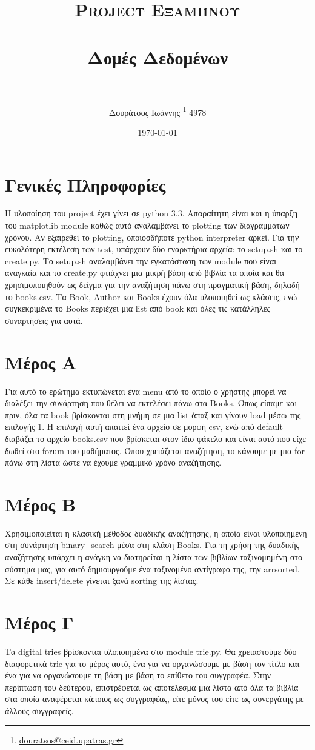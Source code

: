 \documentclass[a4paper]{article}
\title{	
\normalfont \normalsize 
\textsc{Project Εξαμήνου} \\ [30pt] %
\horrule{0.5pt} \\[0.4cm] %
\huge Δομές Δεδομένων \\ %
\horrule{2pt} \\[0.5cm] %
\vspace*{4\baselineskip}
}
\author[]{Δουράτσος Ιωάννης  \thanks{\href{mailto:douratsos@ceid.upatras.gr}{douratsos@ceid.upatras.gr}} 4978 }
\affil[]{Τμήμα Μηχανικών Η/Υ και Πληροφορικής, Πανεπιστήμιο Πατρών}
\date{\normalsize\today} %
\begin{document}
\newpage
\maketitle %
\newpage
\tableofcontents
\vspace*{1\baselineskip}
\newpage
\section{Γενικές Πληροφορίες}
Η υλοποίηση του project έχει γίνει σε python 3.3. Απαραίτητη είναι και η ύπαρξη του matplotlib module καθώς αυτό αναλαμβάνει το plotting των διαγραμμάτων χρόνου.
Αν εξαιρεθεί το plotting, οποιοσδήποτε python interpreter αρκεί.
Για την ευκολότερη εκτέλεση των test, υπάρχουν δύο εναρκτήρια αρχεία: το setup.sh και το create.py. Το setup.sh αναλαμβάνει την εγκατάσταση των module που είναι αναγκαία και το create.py φτιάχνει μια μικρή βάση από βιβλία τα οποία και θα χρησιμοποιηθούν ως δείγμα για την αναζήτηση πάνω στη πραγματική βάση, δηλαδή το books.csv.
Τα Book, Author και Books έχουν όλα υλοποιηθεί ως κλάσεις, ενώ συγκεκριμένα το Books περιέχει μια list από book και όλες τις κατάλληλες συναρτήσεις για αυτά.


\section{Μέρος Α}
Για αυτό το ερώτημα εκτυπώνεται ένα menu από το οποίο ο χρήστης μπορεί να διαλέξει την συνάρτηση που θέλει να εκτελέσει πάνω στα Books. Όπως είπαμε και πριν, όλα τα book βρίσκονται στη μνήμη σε μια list άπαξ και γίνουν load μέσω της επιλογής 1. 
Η επιλογή αυτή απαιτεί ένα αρχείο σε μορφή csv, ενώ από default διαβάζει το αρχείο books.csv που βρίσκεται στον ίδιο φάκελο και είναι αυτό που είχε δωθεί στο forum του μαθήματος. Όπου χρειάζεται αναζήτηση, το κάνουμε με μια for πάνω στη λίστα ώστε να έχουμε γραμμικό χρόνο αναζήτησης.

\section{Μέρος Β}
Χρησιμοποιείται η κλασική μέθοδος δυαδικής αναζήτησης, η οποία είναι υλοποιημένη στη συνάρτηση binary\_search μέσα στη κλάση Books. Για τη χρήση της δυαδικής αναζήτησης υπάρχει η ανάγκη να διατηρείται η λίστα των βιβλίων ταξινομημένη στο σύστημα μας, για αυτό δημιουργούμε ένα ταξινομένο αντίγραφο της, την arrsorted. Σε κάθε insert/delete γίνεται ξανά sorting της λίστας.

\section{Μέρος Γ}
Τα digital tries βρίσκονται υλοποιημένα στο module trie.py. Θα χρειαστούμε δύο διαφορετικά trie για το μέρος αυτό, ένα για να οργανώσουμε με βάση τον τίτλο και ένα για να οργανώσουμε τη βάση με βάση το επίθετο του συγγραφέα. Στην περίπτωση του δεύτερου, επιστρέφεται ως αποτέλεσμα μια λίστα από όλα τα βιβλία στα οποία αναφέρεται κάποιος ως συγγραφέας, είτε μόνος του είτε ως συνεργάτης με άλλους συγγραφείς.
\end{document}
